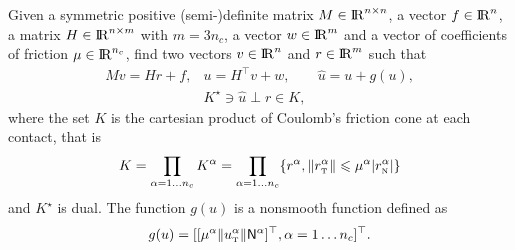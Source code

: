  Given a symmetric positive (semi-)definite matrix ${M} \in \mathrm{I\!R}^{n \times n}$, a vector $ {f} \in \mathrm{I\!R}^n$, a matrix  ${H} \in \mathrm{I\!R}^{n \times m}$ with $m= 3n_c$, a vector $w \in \mathrm{I\!R}^{m}$ and a vector of coefficients of friction $\mu \in \mathrm{I\!R}^{n_c}$, find two vectors $ {v} \in \mathrm{I\!R}^n$ and $r\in \mathrm{I\!R}^m$ such that
\begin{equation}\label{eq:soccp1-intro}
  \begin{array}{rcl}
    M v = {H} {r} + {f}, &
    u = H^\top v + w,  &
    \hat u = u + g(u) ,\\[1mm]
    &    K^\star \ni {\hat u} \perp r \in K,&
  \end{array}
\end{equation}
where the set $K$ is the cartesian product of Coulomb's friction cone at each contact, that is
\begin{equation}
  \label{eq:CC}
  K = \prod_{\alpha=1\ldots n_c} K^{\alpha}  = \prod_{\alpha=1\ldots n_c} \{r^\alpha, \|r^\alpha_\t \| \leq \mu^\alpha |r^\alpha_\n| \}
\end{equation}
and $K^\star$ is dual. The function $g(u)$ is a nonsmooth function defined as
\begin{equation}
g(u) = [[\mu^\alpha  \|u^\alpha_\t\| {\sf N}^\alpha]^\top, \alpha = 1\ldots n_c]^\top\label{eq:gg}. 
\end{equation}
